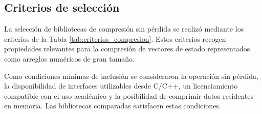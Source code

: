 \subsection{Criterios de selección}

La selección de bibliotecas de compresión sin pérdida se realizó mediante los criterios de la
Tabla \ref{tab:criterios_compresion}. Estos criterios recogen propiedades relevantes para la
compresión de vectores de estado representados como arreglos numéricos de gran tamaño.

Como condiciones mínimas de inclusión se consideraron la operación sin pérdida, la
disponibilidad de interfaces utilizables desde C/C++, un licenciamiento compatible con el uso
académico y la posibilidad de comprimir datos residentes en memoria. Las bibliotecas
comparadas satisfacen estas condiciones.

